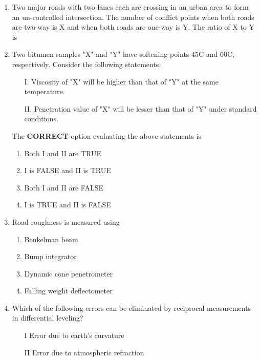 \documentclass[journal]{IEEEtran}
\numberwithin{equation}{enumi}
\numberwithin{figure}{enumi}
\begin{document}
\begin{enumerate}
\item Two major roads with two lanes each are crossing in an urban area to form an un-controlled intersection. The number of conflict points when both roads are two-way is X and when both roads are one-way is Y. The ratio of X to Y is

\begin{enumerate}
\end{enumerate}

\item Two bitumen samples "X" and "Y" have softening points 45\degree C and 60\degree C, respectively. Consider the following statements:

\begin{enumerate}
    \item[I.] Viscosity of "X" will be higher than that of "Y" at the same temperature.
    \item[II.] Penetration value of "X" will be lesser than that of "Y" under standard conditions.
\end{enumerate}

The \textbf{CORRECT} option evaluating the above statements is

\begin{enumerate}
    \item Both I and II are TRUE
    \item I is FALSE and II is TRUE
    \item Both I and II are FALSE
    \item I is TRUE and II is FALSE
\end{enumerate}

\item  Road roughness is measured using

\begin{enumerate}
    \item Benkelman beam
    \item Bump integrator
    \item Dynamic cone penetrometer
    \item Falling weight deflectometer
\end{enumerate}

\item Which of the following errors can be eliminated by reciprocal measurements in differential leveling?\\
        \begin{enumerate}
            \item[I] Error due to earth's curvature
            \item[II] Error due to atmospheric refraction
        \end{enumerate}


\end{enumerate}
\end{document}
